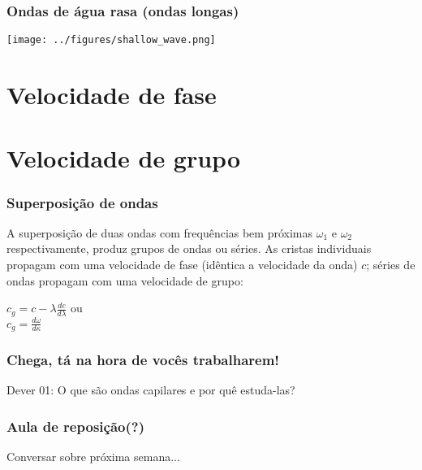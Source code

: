 \documentclass[handout,14pt,xcolor=dvipsnames]{beamer}
\begin{document}
\begin{frame}
\frametitle{Ondas de água rasa (ondas longas)}
    \begin{center}
        \texttt{[image: ../figures/shallow\_wave.png]}
    \end{center}
\end{frame}


\section{Velocidade de fase}

\section{Velocidade de grupo}
\begin{frame}
\frametitle{Superposição de ondas}
    \begin{block}{}
    A superposição de duas ondas com frequências bem próximas $\omega_1$ e
    $\omega_2$ respectivamente, produz grupos de ondas ou séries.  As cristas
    individuais propagam com uma velocidade de fase (idêntica a velocidade da
    onda) $c$;  séries de ondas propagam com uma velocidade de grupo:
    \end{block}
    \pause
    \begin{center}
        $c_g = c - \lambda \frac{dc}{d\lambda}$ ou\\
        $c_g = \frac{d\omega}{d\kappa}$
    \end{center}
\end{frame}

\begin{frame}
\frametitle{Chega, tá na hora de vocês trabalharem!}
    \begin{block}{}
    Dever 01: O que são ondas capilares e por quê estuda-las?
    \end{block}
\end{frame}

\begin{frame}
\frametitle{Aula de reposição(?)}
    \begin{block}{}
    Conversar sobre próxima semana...
    \end{block}
\end{frame}
\end{document}
